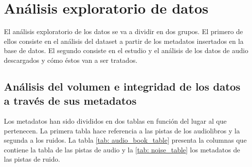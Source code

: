 \chapter{Análisis exploratorio de datos}\label{cp: eda}
El análisis exploratorio de los datos se va a dividir en dos grupos. El primero de ellos consiste en el análisis del dataset a partir de los metadatos insertados en la base de datos. El segundo consiste en el estudio y el análisis de los datos de audio descargados y cómo éstos van a ser tratados.

\section{Análisis del volumen e integridad de los datos a través de sus metadatos}
Los metadatos han sido divididos en dos tablas en función del lugar al que pertenecen. La primera tabla hace referencia a las pistas de los audiolibros y la segunda a los ruidos. La tabla \ref{tab: audio_book_table} presenta la columnas que contiene la tabla de las pistas de audio y la \ref{tab: noise_table} los metadatos de las pistas de ruido.

